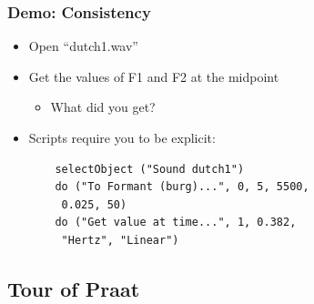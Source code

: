 \documentclass[handout]{beamer}
\begin{document}
\begin{frame}[fragile]
\frametitle{Demo: Consistency}

\begin{itemize}
\item <1-> Open ``dutch1.wav''
\item <1-> Get the values of F1 and F2 at the midpoint
\begin{itemize}
    \item What did you get?
\end{itemize}

\item <2-> Scripts require you to be explicit:
\begin{verbatim}
    selectObject ("Sound dutch1")
    do ("To Formant (burg)...", 0, 5, 5500,
     0.025, 50)
    do ("Get value at time...", 1, 0.382,
     "Hertz", "Linear")
\end{verbatim}
\end{itemize}

\end{frame}

\subsection{Tour of Praat}
\end{document}

